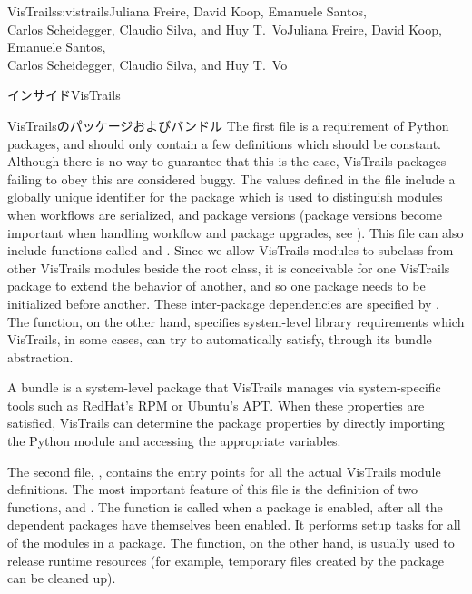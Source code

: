\begin{aosachaptertoc}{VisTrails}{s:vistrails}{Juliana Freire, David Koop, Emanuele Santos, \\ Carlos Scheidegger, Claudio Silva, and Huy T.\ Vo}{Juliana Freire, David Koop, Emanuele Santos, \\ \hspace*{0.9cm} Carlos Scheidegger, Claudio Silva, and Huy T.\ Vo}
\begin{aosasect1}{インサイドVisTrails}
\begin{aosasect2}{VisTrailsのパッケージおよびバンドル}
The first file  is a requirement of Python
packages, and should only contain a few definitions which should be
constant. Although there is no way to guarantee that this is the case,
VisTrails packages failing to obey this are considered buggy. The
values defined in the file include a globally unique identifier for
the package which is used to distinguish modules when workflows are
serialized, and package versions (package versions become important
when handling workflow and package upgrades, see
). This file can also include
functions called  and
. Since we allow VisTrails modules to
subclass from other VisTrails modules beside the root 
class, it is conceivable for one VisTrails package to extend the
behavior of another, and so one package needs to be initialized before
another. These inter-package dependencies are specified by
. The 
function, on the other hand, specifies system-level library
requirements which VisTrails, in some cases, can try to automatically
satisfy, through its bundle abstraction.

A bundle is a system-level package that VisTrails manages via
system-specific tools such as RedHat's RPM or Ubuntu's APT\@.  When
these properties are satisfied, VisTrails can determine the package
properties by directly importing the Python module and accessing the
appropriate variables.

The second file, , contains the entry points for all the
actual VisTrails module definitions. The most important feature of
this file is the definition of two functions,  and
. The  function is called when a
package is enabled, after all the dependent packages have themselves
been enabled. It performs setup tasks for all of the modules in a
package. The  function, on the other hand, is usually
used to release runtime resources (for example, temporary files
created by the package can be cleaned up).


\end{aosasect2}
\end{aosasect1}
\end{aosachaptertoc}
